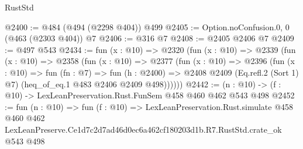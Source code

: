 \begin{lexlean}{RustStd}
\begin{coremodule}
@2400 := @484 (@494 (@2298 @404)) @499
@2405 := Option.noConfusion.{0, 0} (@463 (@2303 @404)) @7
@2406 := @316 @7
@2408 := @2405 @2406 @7
@2409 := @497 @543
@2434 := fun (x : @10) =>
  @2320
    (fun (x : @10) =>
    @2339
      (fun (x : @10) =>
      @2358
        (fun (x : @10) =>
        @2377
          (fun (x : @10) =>
          @2396
            (fun (x : @10) =>
            fun (fn : @7) =>
            fun (h : @2400) =>
            @2408 @2409 (Eq.refl.{2} (Sort 1) @7) (heq_of_eq.{1} @483 @2406 @2409 @498))))))
@2442 := (n : @10) -> (f : @10) -> LexLeanPreservation.Rust.FunSem @458 @460 @462 @543 @498
@2452 := fun (n : @10) =>
  fun (f : @10) =>
  LexLeanPreservation.Rust.simulate
    @458
    @460
    @462
    LexLeanPreserve.Ce1d7c2d7ad46d0ec6a462cf180203d1b.R7.RustStd.crate_ok
    @543
    @498
\end{coremodule}
\end{lexlean}

